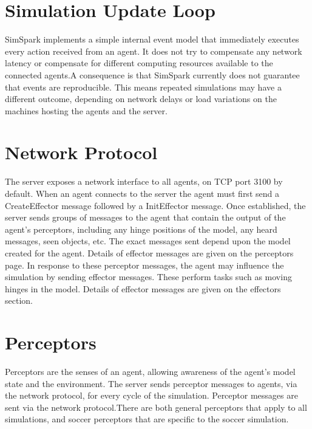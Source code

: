 \section{Simulation Update Loop}
SimSpark implements a simple internal event model that immediately executes every action received from an agent. It does not try to compensate any network latency or compensate for different computing resources available to the connected agents.A consequence is that SimSpark currently does not guarantee that events are reproducible. This means repeated simulations may have a different outcome, depending on network delays or load variations on the machines hosting the agents and the server.\cite{SimSpark}




\section{Network Protocol}
The server exposes a network interface to all agents, on TCP port 3100 by default.
When an agent connects to the server the agent must first send a CreateEffector message followed by a InitEffector message.
Once established, the server sends groups of messages to the agent that contain the output of the agent's perceptors, including any hinge positions of the model, any heard messages, seen objects, etc. The exact messages sent depend upon the model created for the agent. Details of effector messages are given on the perceptors page. In response to these perceptor messages, the agent may influence the simulation by sending effector messages. These perform tasks such as moving hinges in the model. Details of effector messages are given on the effectors section.\cite{SimSpark}


\section{Perceptors}
Perceptors are the senses of an agent, allowing awareness of the agent's model state and the environment.
The server sends perceptor messages to agents, via the network protocol, for every cycle of the simulation.
Perceptor messages are sent via the network protocol.There are both general perceptors that apply to all simulations, and soccer perceptors that are specific to the soccer simulation.\cite{SimSpark}



